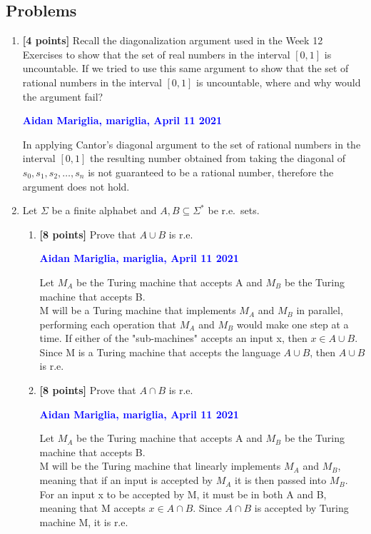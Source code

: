 \documentclass[11pt,fleqn]{article}
\newcommand{\be}{\begin{enumerate}}
\newcommand{\ee}{\end{enumerate}}
\begin{document}
\newpage

\subsection*{Problems}

\be

  \item \textbf{[4 points]} Recall the diagonalization argument used
    in the Week 12 Exercises to show that the set of real numbers in
    the interval $[0,1]$ is uncountable.  If we tried to use this same
    argument to show that the set of rational numbers in the interval
    $[0,1]$ is uncountable, where and why would the argument fail?

  \bigskip

  \textcolor{blue}{\textbf{Aidan Mariglia, mariglia, April 11 2021}}

  In applying Cantor's diagonal argument to the set of rational numbers
  in the interval $[0, 1]$ the resulting number obtained from taking
  the diagonal of $s_0,s_1,s_2, \dots, s_n$ is not guaranteed to be a
  rational number, therefore the argument does not hold.

  \item Let $\Sigma$ be a finite alphabet and $A,B \subseteq \Sigma^*$
    be r.e.~sets.

  \be

    \item\textbf{[8 points]} Prove that $A \cup B$ is r.e.

    \bigskip

    \textcolor{blue}{\textbf{Aidan Mariglia, mariglia, April 11 2021}}

    Let $M_A$ be the Turing machine that accepts A and $M_B$ be the Turing
    machine that accepts B.
    \medskip\\
    M will be a Turing machine that implements $M_A$ and $M_B$ in parallel,
    performing each operation that $M_A$ and $M_B$ would make one step at a
    time. If either of the "sub-machines" accepts an input x, then $x \in
    A \cup B$. Since M is a Turing machine that accepts the language $A \cup B$,
    then $A \cup B$ is r.e.
    

    \medskip

    \item\textbf{[8 points]} Prove that $A \cap B$ is r.e.

    \bigskip

    \textcolor{blue}{\textbf{Aidan Mariglia, mariglia, April 11 2021}}

    Let $M_A$ be the Turing machine that accepts A and $M_B$ be the Turing
    machine that accepts B.
    \medskip\\

    M will be the Turing machine that linearly implements $M_A$ and $M_B$,
    meaning that if an input is accepted by $M_A$ it is then passed into
    $M_B$. For an input x to be accepted by M, it must be in both A and B,
    meaning that M accepts $x \in A \cap B$. Since $A \cap B$ is accepted
    by Turing machine M, it is r.e. 

    

  \ee

  \bigskip

\ee
\end{document}
